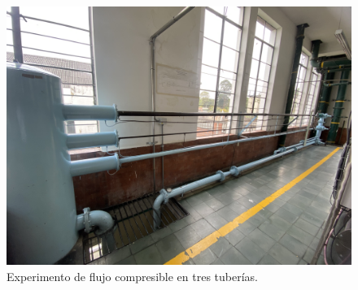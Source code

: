 \documentclass[10pt, a4paper]{exam}
\begin{document}
\begin{figure}[h]
    \centering
    \includegraphics[width=\textwidth]{exp1.jpg}
    \caption{Experimento de flujo compresible en tres tuber\'ias.}
    \label{exp1}
\end{figure}


\end{document}
